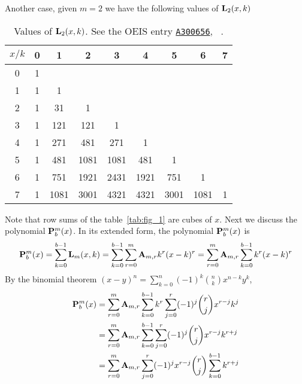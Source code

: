 Another case, given $m=2$ we have the following values of ${\mathbf{L}}\sb{2}(x,k)$
\begin{table}[H]
    \setlength\extrarowheight{-6pt}
    \begin{tabular}{c|cccccccc}
        $x/k$ & 0 & 1    & 2    & 3    & 4    & 5    & 6    & 7 \\
        \hline
        0     & 1 &      &      &      &      &      &      &   \\
        1     & 1 & 1    &      &      &      &      &      &   \\
        2     & 1 & 31   & 1    &      &      &      &      &   \\
        3     & 1 & 121  & 121  & 1    &      &      &      &   \\
        4     & 1 & 271  & 481  & 271  & 1    &      &      &   \\
        5     & 1 & 481  & 1081 & 1081 & 481  & 1    &      &   \\
        6     & 1 & 751  & 1921 & 2431 & 1921 & 751  & 1    &   \\
        7     & 1 & 1081 & 3001 & 4321 & 4321 & 3001 & 1081 & 1
    \end{tabular}
    \caption{Values of ${\mathbf{L}}\sb{2}(x,k)$.
    See the OEIS entry \href{https://oeis.org/A300656}{\texttt{A300656}}, ~\cite{kolosov2018fifth}.}
    \label{tab:row-sums-give-fifth-power}
\end{table}
Note that row sums of the table~\eqref{tab:fig_1} are cubes of $x$.
Next we discuss the polynomial ${\mathbf{P}}\sp{m} \sb{b}(x)$.
In its extended form, the polynomial ${\mathbf{P}}\sp{m} \sb{b}(x)$ is
\begin{equation*}
    \begin{split}
        {\mathbf{P}}\sp{m} \sb{b}(x) = \sum_{k=0}^{b-1} {\mathbf{L}}\sb{m}(x,k)
        =\sum_{k=0}^{b-1} \sum_{r=0}^{m} {\mathbf{A}} \sb{m,r} k^r(x-k)^r
        =\sum_{r=0}^{m} {\mathbf{A}} \sb{m,r} \sum_{k=0}^{b-1} k^r(x-k)^r
    \end{split}
\end{equation*}
By the binomial theorem $(x-y)^n = \sum_{k=0}^{n} (-1)^{k} \binom{n}{k} x^{n-k} y^{k}$,
\begin{equation*}
    \begin{split}
        {\mathbf{P}}\sp{m} \sb{b}(x)
        &=\sum_{r=0}^{m} {\mathbf{A}} \sb{m,r} \sum_{k=0}^{b-1} k^r \sum_{j=0}^{r} (-1)^{j} \binom{r}{j} x^{r-j} k^{j} \\
        &=\sum_{r=0}^{m} {\mathbf{A}} \sb{m,r} \sum_{k=0}^{b-1} \sum_{j=0}^{r} (-1)^{j} \binom{r}{j} x^{r-j} k^{r+j} \\
        &=\sum_{r=0}^{m} {\mathbf{A}} \sb{m,r} \sum_{j=0}^{r} (-1)^{j} x^{r-j} \binom{r}{j} \sum_{k=0}^{b-1} k^{r+j} \\
    \end{split}
\end{equation*}
